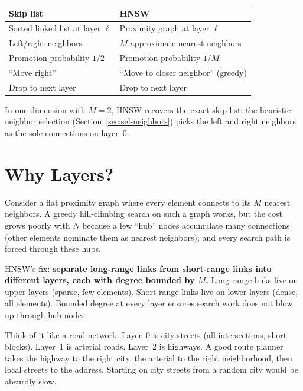 \documentclass[11pt]{article}
\theoremstyle{definition}
\begin{document}
\begin{center}
\begin{tabular}{ll}
\toprule
Skip list & HNSW \\
\midrule
Sorted linked list at layer $\ell$ & Proximity graph at layer $\ell$ \\
Left/right neighbors & $M$ approximate nearest neighbors \\
Promotion probability $1/2$ & Promotion probability $1/M$ \\
``Move right'' & ``Move to closer neighbor'' (greedy) \\
Drop to next layer & Drop to next layer \\
\bottomrule
\end{tabular}
\end{center}

In one dimension with $M=2$, HNSW recovers the exact skip list: the heuristic neighbor selection (Section~\ref{sec:sel-neighbors}) picks the left and right neighbors as the sole connections on layer~0.

\section{Why Layers?}
\label{sec:why-layers}

Consider a flat proximity graph where every element connects to its $M$ nearest neighbors. A greedy hill-climbing search on such a graph works, but the cost grows poorly with $N$ because a few ``hub'' nodes accumulate many connections (other elements nominate them as nearest neighbors), and every search path is forced through these hubs.

HNSW's fix: \textbf{separate long-range links from short-range links into different layers, each with degree bounded by $M$.} Long-range links live on upper layers (sparse, few elements). Short-range links live on lower layers (dense, all elements). Bounded degree at every layer ensures search work does not blow up through hub nodes.

\begin{intubox}
Think of it like a road network. Layer~0 is city streets (all intersections, short blocks). Layer~1 is arterial roads. Layer~2 is highways. A good route planner takes the highway to the right city, the arterial to the right neighborhood, then local streets to the address. Starting on city streets from a random city would be absurdly slow.
\end{intubox}
\end{document}
